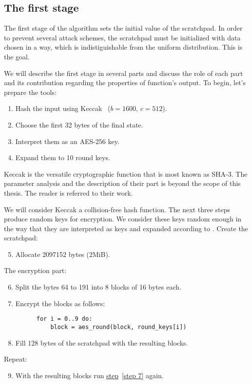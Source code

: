 \subsection{The first stage} \label{sec:first}
The first stage of the algorithm sets the initial value of the scratchpad. In order to prevent several attack schemes, the scratchpad must be initialized with data chosen in a way, which is indistiguishable from the uniform distribution. This is the goal.

We will describe the first stage in several parts and discuss the role of each part and its contribution regarding the properties of function's output. To begin, let's prepare the tools:
\begin{enumerate}
  \item \label{hashing} Hash the input using Keccak~\cite{keccak} ($b=1600$, $c=512$).
  \item Choose the first 32 bytes of the final state.
  \item Interpret them as an AES-256 key.
  \item Expand them to 10 round keys.
\end{enumerate}

Keccak is the versatile cryptographic function that is most known as SHA-3. The parameter analysis and the description of their part is beyond the scope of this thesis. The reader is referred to their work.

We will consider Keccak a collision-free hash function. The next three steps produce random keys for encryption. We consider these keys random enough in the way that they are interpreted as keys and expanded according to \cite{nla.cat-vn4183631}. Create the scratchpad:
\begin{enumerate}
  \setcounter{enumi}{4}
  \item Allocate 2097152 bytes (2MiB).
\end{enumerate}
The encryption part:
\begin{enumerate}
  \setcounter{enumi}{5}
  \item Split the bytes 64 to 191 into 8 blocks of 16 bytes each.
  \item \label{step 7} Encrypt the blocks as follows:
    \begin{verbatim}
      for i = 0..9 do:
          block = aes_round(block, round_keys[i])
    \end{verbatim}
\end{enumerate}
\begin{enumerate}
  \setcounter{enumi}{7}
  \item Fill 128 bytes of the scratchpad with the resulting blocks.
\end{enumerate}
Repeat:
\begin{enumerate}
  \setcounter{enumi}{8}
  \item With the resulting blocks run \hyperref[step 7]{step}~\ref{step 7} again.
\end{enumerate}

